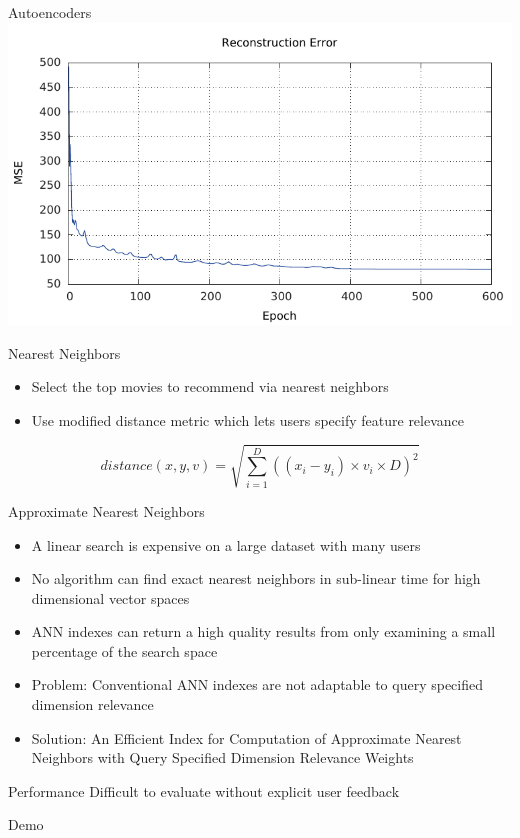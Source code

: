 \documentclass{beamer}
\begin{document}
\begin{frame}{Autoencoders}
\centering
\includegraphics[width=0.8\linewidth]{../paper/error.pdf}
\end{frame}

\begin{frame}{Nearest Neighbors}
\begin{itemize}
\item Select the top movies to recommend via nearest neighbors
\item Use modified distance metric which lets users specify feature relevance
\end{itemize}
\begin{equation}
distance(x,y,v) = \sqrt{\sum\limits_{i=1}^D ((x_i - y_i) \times v_i \times D)^2} 
\end{equation}
\end{frame}

\begin{frame}{Approximate Nearest Neighbors}
\begin{itemize}
\item A linear search is expensive on a large dataset with many users
\item No algorithm can find exact nearest neighbors in sub-linear time for high dimensional vector spaces
\item ANN indexes can return a high quality results from only examining a small percentage of the search space
\item Problem: Conventional ANN indexes are not adaptable to query specified dimension relevance
\item Solution: An Efficient Index for Computation of Approximate Nearest Neighbors with Query Specified Dimension Relevance Weights
\end{itemize}
\end{frame}

\begin{frame}{Performance}
Difficult to evaluate without explicit user feedback
\end{frame}

\begin{frame}{Demo}
\end{frame}

\begin{frame}
\titlepage
\end{frame}
\end{document}
